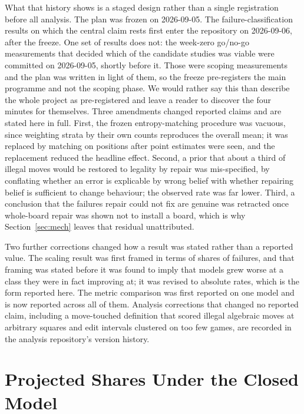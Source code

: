 \documentclass[11pt]{article}
\begin{document}
What that history shows is a staged design rather than a single registration before
all analysis. The plan was frozen on 2026-09-05. The failure-classification
results on which the central claim rests first enter the repository on
2026-09-06, after the freeze. One set of results does not: the week-zero
go/no-go measurements that decided which of the candidate studies was viable were
committed on 2026-09-05, shortly before it. Those were scoping measurements
and the plan was written in light of them, so the freeze pre-registers the main
programme and not the scoping phase. We would rather say this than describe the whole
project as pre-registered and leave a reader to discover the four minutes for
themselves.
Three amendments changed reported claims and are stated here in full. First, the
frozen entropy-matching procedure was vacuous, since weighting strata by their own
counts reproduces the overall mean; it was replaced by matching on positions after
point estimates were seen, and the replacement reduced the headline effect. Second,
a prior that about a third of illegal moves would be restored to legality by repair
was mis-specified, by conflating whether an error is explicable by wrong belief with
whether repairing belief is sufficient to change behaviour; the observed rate was
far lower. Third, a conclusion that the failures repair could not fix are genuine
was retracted once whole-board repair was shown not to install a board, which is
why Section~\ref{sec:mech} leaves that residual unattributed.

Two further corrections changed how a result was stated rather than a reported
value. The scaling result was first framed in terms of shares of failures, and that
framing was stated before it was found to imply that models grew worse at a class
they were in fact improving at; it was revised to absolute rates, which is the form
reported here. The metric comparison was first reported on one model and is now
reported across all of them. Analysis corrections that changed no reported claim,
including a move-touched definition that scored illegal algebraic moves at
arbitrary squares and edit intervals clustered on too few games, are recorded in the
analysis repository's version history.





\section{Projected Shares Under the Closed Model}
\label{app:proj}
\end{document}
